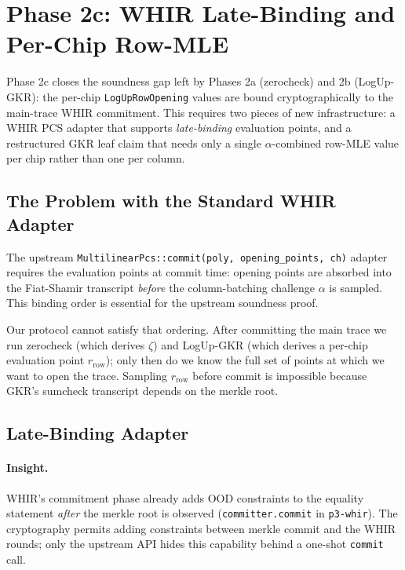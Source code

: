 \section{Phase 2c: WHIR Late-Binding and Per-Chip Row-MLE}
\label{sec:whir-late-binding}

Phase 2c closes the soundness gap left by Phases 2a (zerocheck) and 2b
(LogUp-GKR): the per-chip \texttt{LogUpRowOpening} values are bound
cryptographically to the main-trace WHIR commitment.  This requires
two pieces of new infrastructure: a WHIR PCS adapter that supports
\emph{late-binding} evaluation points, and a restructured GKR leaf
claim that needs only a single $\alpha$-combined row-MLE value per
chip rather than one per column.

\subsection{The Problem with the Standard WHIR Adapter}

The upstream \texttt{MultilinearPcs::commit(poly, opening\_points, ch)}
adapter requires the evaluation points at commit time: opening points
are absorbed into the Fiat-Shamir transcript \emph{before} the
column-batching challenge $\alpha$ is sampled.  This binding order is
essential for the upstream soundness proof.

Our protocol cannot satisfy that ordering.  After committing the main
trace we run zerocheck (which derives $\zeta$) and LogUp-GKR (which
derives a per-chip evaluation point $r_{\mathrm{row}}$); only then do
we know the full set of points at which we want to open the trace.
Sampling $r_{\mathrm{row}}$ before commit is impossible because GKR's
sumcheck transcript depends on the merkle root.

\subsection{Late-Binding Adapter}

\paragraph{Insight.}
WHIR's commitment phase already adds OOD constraints to the equality
statement \emph{after} the merkle root is observed
(\texttt{committer.commit} in \texttt{p3-whir}).  The cryptography
permits adding constraints between merkle commit and the WHIR rounds;
only the upstream API hides this capability behind a one-shot
\texttt{commit} call.

